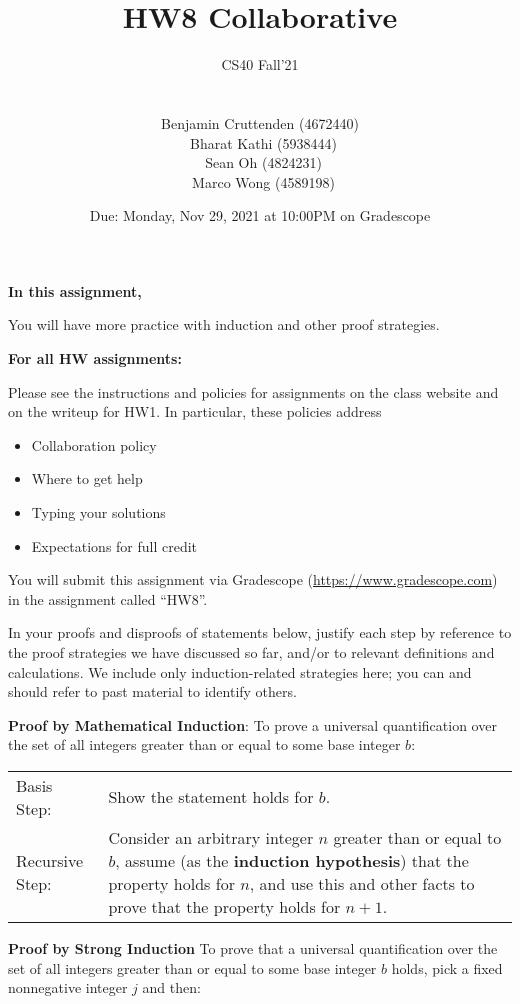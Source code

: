 \documentclass[12pt, oneside]{article}
\title{HW8 Collaborative}
\author{CS40 Fall'21\\\\\\
Benjamin Cruttenden (4672440)\\\
Bharat Kathi (5938444)\\\
Sean Oh (4824231)\\\
Marco Wong (4589198)}
\date{Due: Monday, Nov 29, 2021 at 10:00PM on Gradescope}
\begin{document}
\maketitle

{\bf In this assignment,}

You will have more practice with induction and other proof strategies.


{\bf For all HW assignments:}

Please see the instructions and policies for assignments on the class website and on the writeup for HW1.  In particular, these policies address
\begin{multicols}{2}
\begin{itemize}
\item Collaboration policy
\item Where to get help
\item Typing your solutions
\item Expectations for full credit
\end{itemize}
\end{multicols}


You will submit this assignment via Gradescope
(\href{https://www.gradescope.com}{https://www.gradescope.com}) in the assignment called ``HW8''.


In your proofs and disproofs of statements below, justify each  step
by reference to the proof strategies
we have discussed so far, and/or to relevant definitions and calculations. We include only induction-related strategies here; you can and should refer to past material to identify others.

{\bf Proof by Mathematical Induction}: To prove a universal quantification over the set of  all integers greater than  or  equal to some base integer $b$:

\begin{tabularx}{\textwidth}{l X}
    Basis Step: & Show the statement holds for $b$. \\
    Recursive Step: & Consider an arbitrary integer $n$ greater than or  equal to  $b$, assume
    (as the {\bf induction hypothesis})  that the property holds  for $n$, and use  this and
    other facts to  prove that  the property holds for $n+1$.
\end{tabularx}

{\bf Proof by Strong Induction} To prove that a universal quantification over the set of all integers greater than or equal to some  base integer $b$ holds,  pick a  fixed nonnegative integer  $j$ and then: \hfill 
\end{document}

